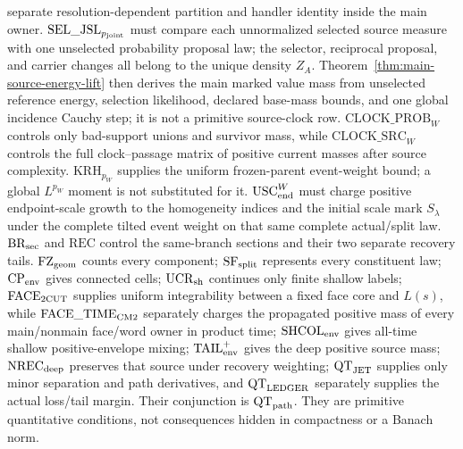 \documentclass[11pt]{article}
\begin{document}
separate resolution-dependent partition and handler identity inside the
main owner.  $\mathrm{SEL\_JSL}_{p_{\rm joint}}$ must compare each
unnormalized selected source measure with one unselected probability proposal
law; the selector, reciprocal proposal, and carrier changes all belong to
the unique density $Z_A$.  Theorem~\ref{thm:main-source-energy-lift} then
derives the main marked value mass from unselected reference energy,
selection likelihood, declared base-mass bounds, and one global incidence
Cauchy step; it is not a primitive source-clock row.  $\mathrm{CLOCK\_PROB}_{W}$
controls only bad-support
unions and survivor mass, while $\mathrm{CLOCK\_SRC}_{W}$ controls the full
clock--passage matrix of positive current masses after source complexity.
$\mathrm{KRH}_{p_W}$ supplies the uniform frozen-parent event-weight bound;
a global $L^{p_W}$ moment is not substituted for it.
$\mathrm{USC}_{\rm end}^{W}$ must charge positive endpoint-scale growth to the
homogeneity indices and the initial scale mark $S_\lambda$ under the complete
tilted event weight on that same complete actual/split law.
$\mathrm{BR}_{\rm sec}$ and $\mathrm{REC}$ control the same-branch
sections and their two separate recovery tails.
$\mathrm{FZ}_{\rm geom}$ counts every component;
$\mathrm{SF}_{\rm split}$ represents every constituent law;
$\mathrm{CP}_{\rm env}$ gives connected cells;
$\mathrm{UCR}_{\rm sh}$ continues only finite shallow labels;
$\mathrm{FACE}_{\rm 2CUT}$ supplies uniform integrability between a fixed
face core and $L(s)$, while $\mathrm{FACE\_TIME}_{\rm CM2}$ separately
charges the propagated positive mass of every main/nonmain face/word owner
in product time;
$\mathrm{SHCOL}_{\rm env}$ gives all-time shallow positive-envelope
mixing; $\mathrm{TAIL}_{\rm env}^{+}$ gives the deep positive source mass;
$\mathrm{NREC}_{\rm deep}$ preserves that source under recovery weighting;
$\mathrm{QT}_{\rm JET}$ supplies only minor separation and path derivatives,
and $\mathrm{QT}_{\rm LEDGER}$ separately supplies the actual loss/tail
margin.  Their conjunction is $\mathrm{QT}_{\rm path}$.
They are primitive quantitative conditions, not consequences hidden in
compactness or a Banach norm.
\end{document}
